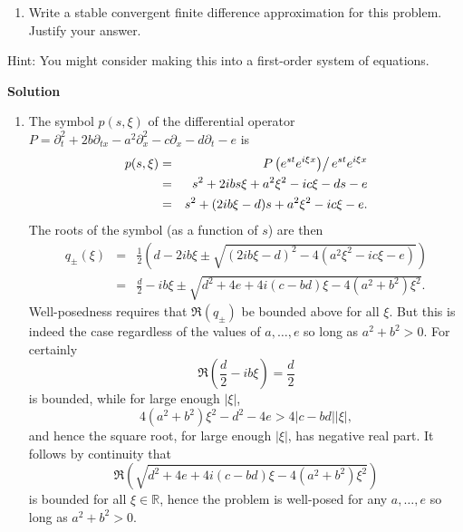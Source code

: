 \documentclass{article}
\begin{document}
\begin{enumerate}
\begin{enumerate}
\item Write a stable convergent finite difference approximation for this problem.  Justify your answer.

\end{enumerate}

Hint:  You might consider making this into a first-order system of equations.

{\bf Solution}

\begin{enumerate}
\item The symbol \(p(s,\xi)\) of the differential operator \(P = \partial_t^2 + 2b\partial_{tx} - a^2\partial_x^2 - c\partial_x - d\partial_t - e\) is
\begin{eqnarray*}
p(s,\xi)
& = & \left. P \left( e^{st} e^{i\xi x} \right) \right/ e^{st} e^{i\xi x} \\
& = & s^2 + 2 i b s \xi + a^2 \xi^2 - i c \xi - d s - e \\
& = & s^2 + (2 i b \xi - d) s + a^2 \xi^2 - i c \xi - e.
\end{eqnarray*}
The roots of the symbol (as a function of \(s\)) are then
\begin{eqnarray*}
q_{\pm}(\xi)
& = & \frac{1}{2} \left( d - 2 i b \xi \pm \sqrt{(2 i b \xi - d)^2 - 4 \left( a^2 \xi^2 - i c \xi - e \right)} \right) \\
& = & \frac{d}{2} - i b \xi \pm \sqrt{d^2 + 4e + 4i (c - bd) \xi - 4 (a^2 + b^2) \xi^2}.
\end{eqnarray*}
Well-posedness requires that \(\Re(q_{\pm})\) be bounded above for all \(\xi\).  But this is indeed the case regardless of the values of \(a, \ldots, e\) so long as \(a^2 + b^2 > 0\).  For certainly
\[\Re \left( \frac{d}{2} - i b \xi \right) = \frac{d}{2}\]
is bounded, while for large enough \(|\xi|\),
\[4 (a^2 + b^2) \xi^2 - d^2 - 4e > 4 |c - bd| |\xi|,\]
and hence the square root, for large enough \(|\xi|\), has negative real part.  It follows by continuity that
\[\Re \left( \sqrt{d^2 + 4e + 4i (c - bd) \xi - 4 (a^2 + b^2) \xi^2} \right)\]
is bounded for all \(\xi \in \mathbb{R}\), hence the problem is well-posed for any \(a, \ldots, e\) so long as \(a^2 + b^2 > 0\).


\end{enumerate}
\end{enumerate}
\end{document}
